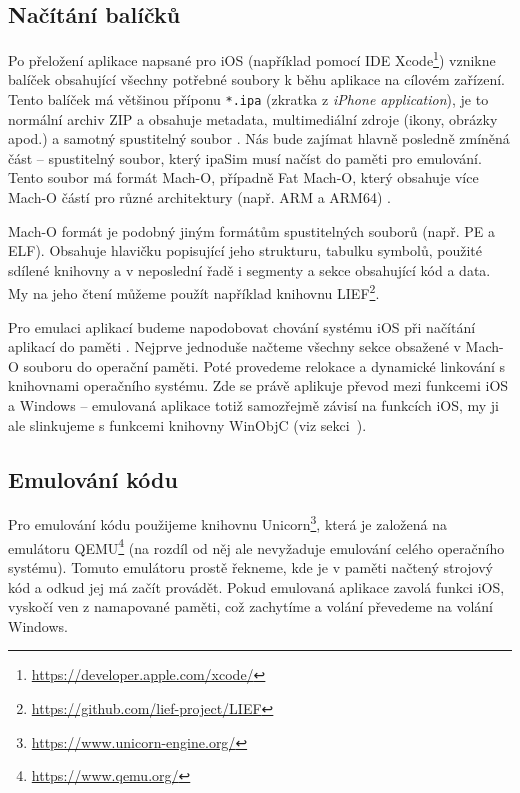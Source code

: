 \documentclass[12pt]{article}
\begin{document}
\subsection*{Načítání balíčků}

Po přeložení aplikace napsané pro iOS (například pomocí IDE Xcode\footnote{\url{https://developer.apple.com/xcode/}}) vznikne balíček obsahující všechny potřebné soubory k běhu aplikace na cílovém zařízení.
Tento balíček má většinou příponu \texttt{*.ipa} (zkratka z \textit{iPhone application}), je to normální archiv ZIP a obsahuje metadata, multimediální zdroje (ikony, obrázky apod.) a samotný spustitelný soubor \cite{ipa}.
Nás bude zajímat hlavně posledně zmíněná část -- spustitelný soubor, který ipaSim musí načíst do paměti pro emulování.
Tento soubor má formát Mach-O, případně Fat Mach-O, který obsahuje více Mach-O částí pro různé architektury (např. ARM a ARM64) \cite{macho}.

Mach-O formát je podobný jiným formátům spustitelných souborů (např. PE a ELF).
Obsahuje hlavičku popisující jeho strukturu, tabulku symbolů, použité sdílené knihovny a v neposlední řadě i segmenty a sekce obsahující kód a data.
My na jeho čtení můžeme použít například knihovnu LIEF\footnote{\url{https://github.com/lief-project/LIEF}}.

Pro emulaci aplikací budeme napodobovat chování systému iOS při načítání aplikací do paměti \cite{execMacho}.
Nejprve jednoduše načteme všechny sekce obsažené v Mach-O souboru do operační paměti.
Poté provedeme relokace a dynamické linkování s knihovnami operačního systému.
Zde se právě aplikuje převod mezi funkcemi iOS a Windows -- emulovaná aplikace totiž samozřejmě závisí na funkcích iOS, my ji ale slinkujeme s funkcemi knihovny WinObjC (viz sekci~).

\subsection*{Emulování kódu}

Pro emulování kódu použijeme knihovnu Unicorn\footnote{\url{https://www.unicorn-engine.org/}}, která je založená na emulátoru QEMU\footnote{\url{https://www.qemu.org/}} (na rozdíl od něj ale nevyžaduje emulování celého operačního systému).
Tomuto emulátoru prostě řekneme, kde je v paměti načtený strojový kód a odkud jej má začít provádět.
Pokud emulovaná aplikace zavolá funkci iOS, vyskočí ven z namapované paměti, což zachytíme a volání převedeme na volání Windows.
\end{document}
